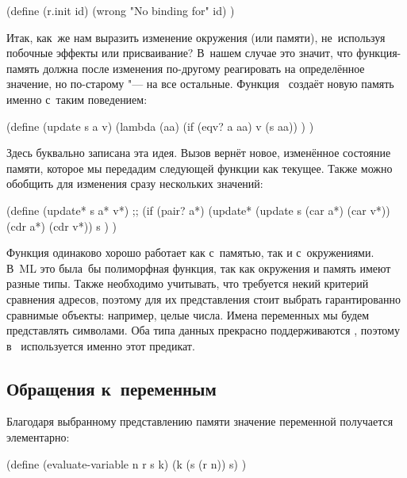 \begin{code:lisp}
(define (r.init id)
  (wrong "No binding for" id) )
\end{code:lisp}

Итак, как~же нам выразить изменение окружения (или памяти), не~используя
побочные эффекты или присваивание? В~нашем случае это значит, что функция-память
должна после изменения по-другому реагировать на определённое значение, но
по-старому "--- на все остальные. Функция~ создаёт новую память
именно с~таким поведением:

\begin{code:lisp}
(define (update s a v)
  (lambda (aa)
    (if (eqv? a aa) v (s aa)) ) )
\end{code:lisp}

Здесь буквально записана эта идея. Вызов  вернёт новое,
изменённое состояние памяти, которое мы передадим следующей функции как текущее.
Также можно обобщить  для изменения сразу нескольких значений:

\begin{code:lisp}
(define (update* s a* v*)
  ;; 
  (if (pair? a*)
      (update* (update s (car a*) (car v*)) (cdr a*) (cdr v*))
      s ) )
\end{code:lisp}

Функция  одинаково хорошо работает как с~памятью, так и
с~окружениями. В~ML это была~бы полиморфная функция, так как окружения и память
имеют разные типы. Также необходимо учитывать, что  требуется некий
критерий сравнения адресов, поэтому для их представления стоит выбрать
гарантированно сравнимые объекты: например, целые числа. Имена переменных мы
будем представлять символами. Оба типа данных прекрасно поддерживаются
, поэтому в~ используется именно этот предикат.


\subsection{Обращения к~переменным}%
\label{assignment/implementation/ssect:reference}

Благодаря выбранному представлению памяти значение переменной получается
элементарно:

\begin{code:lisp}
(define (evaluate-variable n r s k)
  (k (s (r n)) s) )
\end{code:lisp}

